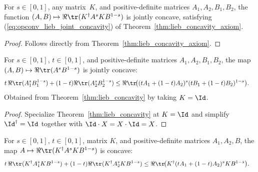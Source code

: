 \begin{theorem}\label{thm:lieb_concavity}
    \leanok
    For $s\in[0,1]$, any matrix~$K$, and positive-definite matrices
    $A_1,A_2,B_1,B_2$, the function
    $(A,B)\mapsto\Re\tr(K^\dagger A^s K B^{1-s})$ is jointly concave,
    satisfying (\ref{eq:opconv_lieb_joint_concavity}) of
    Theorem~\ref{thm:lieb_concavity_axiom}.
\end{theorem}

\begin{proof}\leanok
    Follows directly from Theorem~\ref{thm:lieb_concavity_axiom}.
\end{proof}

\begin{corollary}[Lieb concavity, $K=\Id$ case]\label{cor:lieb_concavity_id}
    \leanok
    For $s\in[0,1]$, $t\in[0,1]$, and positive-definite matrices
    $A_1,A_2,B_1,B_2$, the map
    $(A,B)\mapsto\Re\tr(A^s B^{1-s})$ is jointly concave:
    \begin{align}
        t\,\Re\tr(A_1^s B_1^{1-s})
        +(1-t)\Re\tr(A_2^s B_2^{1-s})
        &\le
        \Re\tr\!\bigl(        (tA_1+(1-t)A_2)^s
            (tB_1+(1-t)B_2)^{1-s}
        \bigr).
        \notag
    \end{align}
    Obtained from Theorem~\ref{thm:lieb_concavity} by taking $K=\Id$.
\end{corollary}

\begin{proof}\leanok
    Specialize Theorem~\ref{thm:lieb_concavity} at $K=\Id$ and simplify
    $\Id^\dagger=\Id$ together with $\Id\cdot X=X\cdot\Id=X$.
\end{proof}

\begin{corollary}
    \label{cor:lieb_concavity_in_fst}
    \leanok
    For $s\in[0,1]$, $t\in[0,1]$, matrix $K$, and positive-definite matrices
    $A_1,A_2,B$, the map
    $A\mapsto\Re\tr(K^\dagger A^s K B^{1-s})$ is concave:
    \begin{align}
        t\,\Re\tr(K^\dagger A_1^s K B^{1-s})
        +(1-t)\Re\tr(K^\dagger A_2^s K B^{1-s})
        &\le
        \Re\tr\!\bigl(        K^\dagger(tA_1+(1-t)A_2)^s K B^{1-s}
        \bigr).
        \notag
    \end{align}
\end{corollary}

